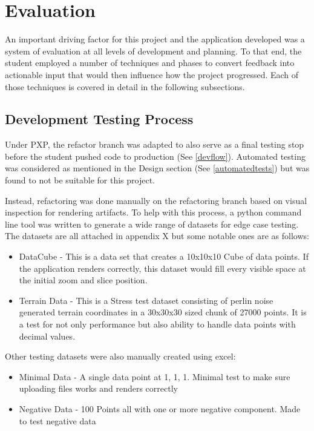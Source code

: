 \section{Evaluation}
An important driving factor for this project and the application developed was a system of evaluation at all levels of development and planning. To that end, the student employed a
number of techniques and phases to convert feedback into actionable input that would then influence how the project progressed. Each of those techniques is covered in detail in the following subsections.

\subsection{Development Testing Process} \label{devtest}
Under PXP, the refactor branch was adapted to also serve as a final testing stop before the student pushed code to production (See \ref{devflow}). Automated testing was considered as mentioned in the Design section (See \ref{automatedtests}) but was found to not be suitable for this project.

Instead, refactoring was done manually on the refactoring branch based on visual inspection for rendering artifacts. To help with this process, a python command line tool was written to generate a wide range of datasets for edge case testing. The datasets are all attached in appendix X but some notable ones are as follows:

\begin{itemize}
    \item DataCube - This is a data set that creates a 10x10x10 Cube of data points. If the application renders correctly, this dataset would fill every visible space at the initial zoom and slice position.
    \item Terrain Data - This is a Stress test dataset consisting of perlin noise generated terrain coordinates in a 30x30x30 sized chunk of 27000 points. It is a test for not only performance but also ability to handle data points with decimal values.
\end{itemize}

Other testing datasets were also manually created using excel:
\begin{itemize}
    \item Minimal Data - A single data point at 1, 1, 1. Minimal test to make sure uploading files works and renders correctly
    \item Negative Data - 100 Points all with one or more negative component. Made to test negative data
\end{itemize}

